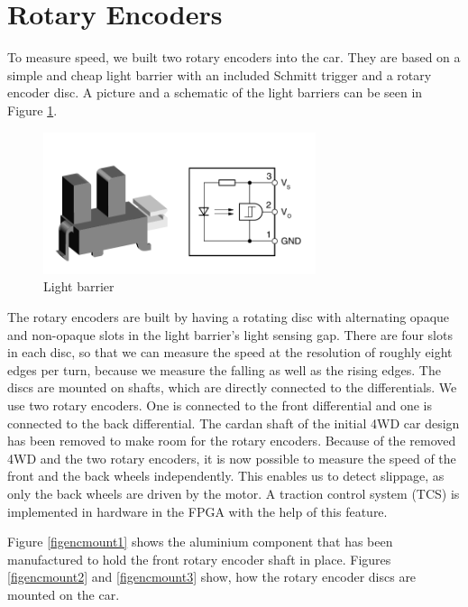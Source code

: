 \documentclass[a4paper
               ,10pt
               ,DIV=10 %
               ,BCOR=0.3cm
               ,pagesize %
               ,headings=small
               ,bibtotoc
               ]
               {scrartcl}
\begin{document}
\section{Rotary Encoders} \label{sensors} %

To measure speed, we built two rotary encoders into the car.
They are based on a simple and cheap light barrier with an included Schmitt trigger and a rotary encoder disc.
A picture and a schematic of the light barriers can be seen in Figure \ref{figls}.
\begin{figure}[H]
\begin{center}
\includegraphics[width=8cm]{pic/ls.png}
\caption{Light barrier}
\label{figls}
\end{center}
\end{figure}


The rotary encoders are built by having a rotating disc with alternating opaque and non-opaque slots in the light barrier's light sensing gap.
There are four slots in each disc, so that we can measure the speed at the resolution of roughly eight edges per turn, because we measure the falling as well as the rising edges.
The discs are mounted on shafts, which are directly connected to the differentials.
We use two rotary encoders.
One is connected to the front differential and one is connected to the back differential.
The cardan shaft of the initial 4WD car design has been removed to make room for the rotary encoders.
Because of the removed 4WD and the two rotary encoders, it is now possible to measure the speed of the front and the back wheels independently.
This enables us to detect slippage, as only the back wheels are driven by the motor.
A traction control system (TCS) is implemented in hardware in the FPGA with the help of this feature.

Figure \ref{figencmount1} shows the aluminium component that has been manufactured to hold the front rotary encoder shaft in place.
Figures \ref{figencmount2} and \ref{figencmount3} show, how the rotary encoder discs are mounted on the car.
\end{document}
